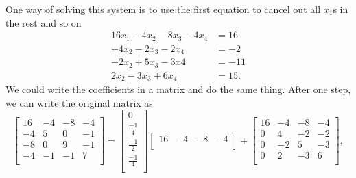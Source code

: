 \documentclass[11pt]{article}
\begin{document}
One way of solving this system is to use the first equation to cancel out all $x_1$s in the rest and so on
\begin{align*}
16x_1 - 4x_2 -8x_3 -4x_4 &= 16\\
            + 4x_2 -2x_3 -2 x_4 &= -2\\
           -2x_2  + 5x_3  -3x4 &= -11\\
            2x_2  -3 x_3 +6x_4 &= 15.
\end{align*}
We could write the coefficients in a matrix  and do the same thing. After one step, we can write the original matrix as
\begin{equation*}
\left[
\begin{matrix}
16 & -4 & -8 & -4 \\
-4 & 5 & 0 & -1 \\
-8 & 0 & 9 & -1\\
-4 & -1 & -1 & 7\\
\end{matrix}
\right] = 
\left[
\begin{matrix}
0\\
\frac{-1}{4}\\
\frac{-1}{2}\\
\frac{-1}{4}\\
\end{matrix}
\right]
\left[
\begin{matrix}
16& -4 & -8 & -4\\
\end{matrix}
\right] + 
\left[
\begin{matrix}
16 & -4 & -8 & -4 \\
0 & 4 & -2 & -2 \\
0 & -2 & 5 & -3\\
0 & 2 & -3 & 6\\
\end{matrix}
\right],
\end{equation*}
\end{document}
